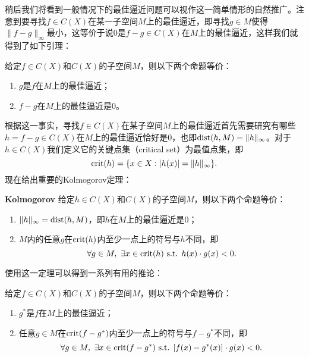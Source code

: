\documentclass[a4paper,10pt]{ctexart}
\begin{document}
稍后我们将看到一般情况下的最佳逼近问题可以视作这一简单情形的自然推广。注意到要寻找$ f\in C(X) $在某一子空间$ M $上的最佳逼近，即寻找$ g\in M $使得$ \| f-g \|_\infty $最小，这等价于说$ 0 $是$ f-g\in C(X) $在$ M $上的最佳逼近，这样我们就得到了如下引理：
\begin{lemma}
    给定$ f\in C(X) $和$ C(X) $的子空间$ M $，则以下两个命题等价：
    \begin{enumerate}
        \item $ g $是$ f $在$ M $上的最佳逼近；
        \item $ f-g $在$ M $上的最佳逼近是$ 0 $。
    \end{enumerate}
\end{lemma}
根据这一事实，寻找$ f\in C(X) $在某子空间$ M $上的最佳逼近首先需要研究有哪些$ h=f-g\in C(X) $在$ M $上的最佳逼近恰好是$ 0 $，也即$ {\rm dist}(h,M) = \| h \|_\infty $。对于$ h\in C(X) $我们定义它的关键点集（critical set）为最值点集，即
\begin{equation}
    {\rm crit}(h) = \{x\in X:|h(x)|=\| h \|_\infty\}.
\end{equation}
现在给出重要的Kolmogorov定理：
\begin{theorem}{\normalfont\bf{Kolmogorov}}
    给定$ h\in C(X) $和$ C(X) $的子空间$ M $，则以下两个命题等价：
    \begin{enumerate}
        \item $ \| h \|_\infty = {\rm dist}(h,M) $，即$ h $在$ M $上的最佳逼近是$ 0 $；
        \item $ M $内的任意$ g $在$ {\rm crit}(h) $内至少一点上的符号与$ h $不同，即
        \begin{equation}
            \forall g\in M,\ \exists x\in {\rm crit}(h) \text{ s.t. }h(x)\cdot g(x)<0.
        \end{equation}
    \end{enumerate}
\end{theorem}
使用这一定理可以得到一系列有用的推论：
\begin{corollary}
    给定$ f\in C(X) $和$ C(X) $的子空间$ M $，则以下两个命题等价：
    \begin{enumerate}
        \item $ g^* $是$ f $在$ M $上的最佳逼近；
        \item 任意$ g\in M $在$ {\rm crit}(f-g^*) $内至少一点上的符号与$ f-g^* $不同，即
        \begin{equation}
            \forall g\in M,\ \exists x\in {\rm crit}(f-g^*) \text{ s.t. }[f(x)-g^*(x)]\cdot g(x)<0.
        \end{equation}
    \end{enumerate}
\end{corollary}
\end{document}
